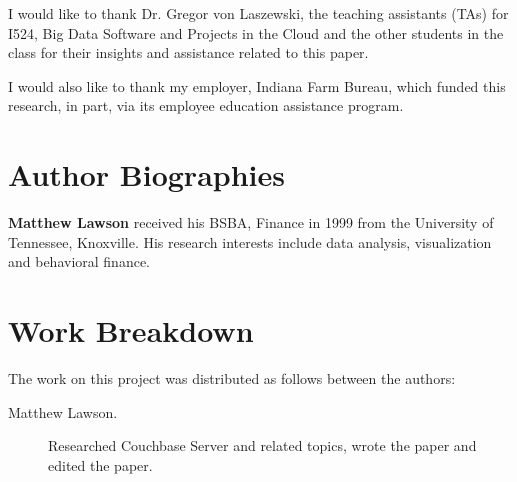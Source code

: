 \documentclass[9pt,twocolumn,twoside]{styles/osajnl}
\begin{document}
I would like to thank Dr. Gregor von Laszewski, the teaching assistants (TAs) for I524, Big Data Software and Projects in the Cloud and the other students in the class for their insights and assistance related to this paper.

I would also like to thank my employer, Indiana Farm Bureau, which funded this research, in part, via its employee education assistance program.




\section*{Author Biographies}
\begingroup
\setlength\intextsep{0pt}
\begin{minipage}[t][3.2cm][t]{1.0\columnwidth} %
  \noindent
  {\bfseries Matthew Lawson} received his BSBA, Finance in 1999 from
  the University of Tennessee, Knoxville. His research interests include
  data analysis, visualization and behavioral finance.
\end{minipage}
\endgroup


\appendix

\section{Work Breakdown}

The work on this project was distributed as follows between the
authors:

\begin{description}
\item[Matthew Lawson.] Researched Couchbase Server and related topics, wrote the paper and edited the paper.
\end{description}
\end{document}
